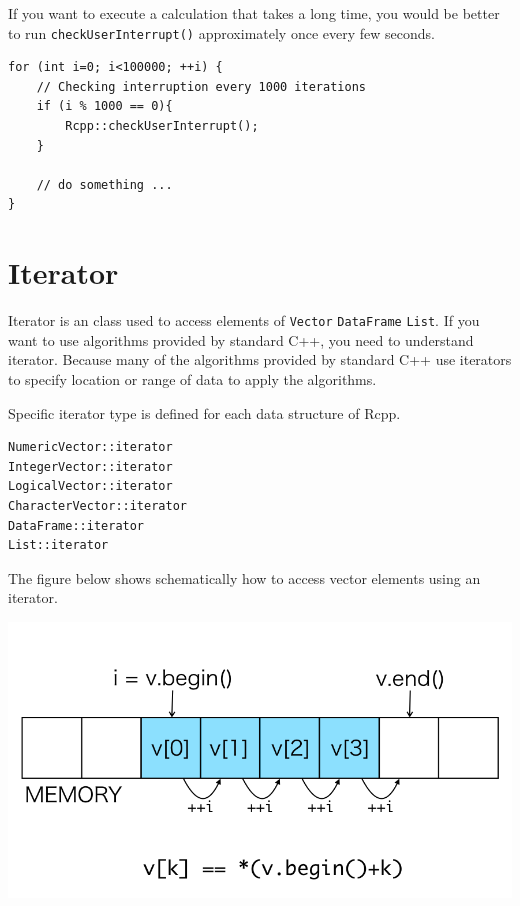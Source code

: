 \documentclass[]{book}
\begin{document}
If you want to execute a calculation that takes a long time, you would be better to run \texttt{checkUserInterrupt()} approximately once every few seconds.

\begin{verbatim}
for (int i=0; i<100000; ++i) {
    // Checking interruption every 1000 iterations
    if (i % 1000 == 0){
        Rcpp::checkUserInterrupt();
    }

    // do something ...
}
\end{verbatim}

\hypertarget{iterator}{%
\chapter{Iterator}\label{iterator}}

Iterator is an class used to access elements of \texttt{Vector} \texttt{DataFrame} \texttt{List}. If you want to use algorithms provided by standard C++, you need to understand iterator. Because many of the algorithms provided by standard C++ use iterators to specify location or range of data to apply the algorithms.

Specific iterator type is defined for each data structure of Rcpp.

\begin{verbatim}
NumericVector::iterator
IntegerVector::iterator
LogicalVector::iterator
CharacterVector::iterator
DataFrame::iterator
List::iterator
\end{verbatim}

The figure below shows schematically how to access vector elements using an iterator.

\includegraphics{iterator.png}
\end{document}
